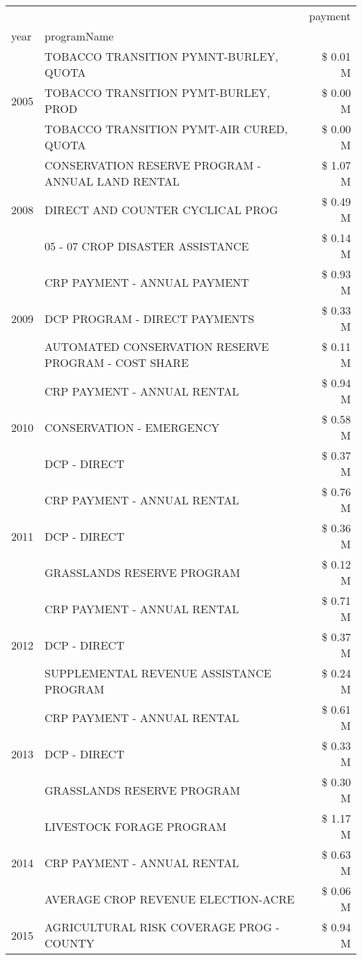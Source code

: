 \begin{tabular}{llr}
\toprule
 &  & payment \\
year & programName &  \\
\midrule
\multirow[t]{3}{*}{2005} & TOBACCO TRANSITION PYMNT-BURLEY, QUOTA & \$ 0.01 M \\
 & TOBACCO TRANSITION PYMT-BURLEY, PROD & \$ 0.00 M \\
 & TOBACCO TRANSITION PYMT-AIR CURED, QUOTA & \$ 0.00 M \\
\cline{1-3}
\multirow[t]{3}{*}{2008} & CONSERVATION RESERVE PROGRAM - ANNUAL LAND RENTAL & \$ 1.07 M \\
 & DIRECT AND COUNTER CYCLICAL PROG & \$ 0.49 M \\
 & 05 - 07 CROP DISASTER ASSISTANCE & \$ 0.14 M \\
\cline{1-3}
\multirow[t]{3}{*}{2009} & CRP PAYMENT - ANNUAL PAYMENT & \$ 0.93 M \\
 & DCP PROGRAM - DIRECT PAYMENTS & \$ 0.33 M \\
 & AUTOMATED CONSERVATION RESERVE PROGRAM - COST SHARE & \$ 0.11 M \\
\cline{1-3}
\multirow[t]{3}{*}{2010} & CRP PAYMENT - ANNUAL RENTAL & \$ 0.94 M \\
 & CONSERVATION - EMERGENCY & \$ 0.58 M \\
 & DCP - DIRECT & \$ 0.37 M \\
\cline{1-3}
\multirow[t]{3}{*}{2011} & CRP PAYMENT - ANNUAL RENTAL & \$ 0.76 M \\
 & DCP - DIRECT & \$ 0.36 M \\
 & GRASSLANDS RESERVE PROGRAM & \$ 0.12 M \\
\cline{1-3}
\multirow[t]{3}{*}{2012} & CRP PAYMENT - ANNUAL RENTAL & \$ 0.71 M \\
 & DCP - DIRECT & \$ 0.37 M \\
 & SUPPLEMENTAL REVENUE ASSISTANCE PROGRAM & \$ 0.24 M \\
\cline{1-3}
\multirow[t]{3}{*}{2013} & CRP PAYMENT - ANNUAL RENTAL & \$ 0.61 M \\
 & DCP - DIRECT & \$ 0.33 M \\
 & GRASSLANDS RESERVE PROGRAM & \$ 0.30 M \\
\cline{1-3}
\multirow[t]{3}{*}{2014} & LIVESTOCK FORAGE PROGRAM & \$ 1.17 M \\
 & CRP PAYMENT - ANNUAL RENTAL & \$ 0.63 M \\
 & AVERAGE CROP REVENUE ELECTION-ACRE & \$ 0.06 M \\
\cline{1-3}
\multirow[t]{3}{*}{2015} & AGRICULTURAL RISK COVERAGE PROG - COUNTY & \$ 0.94 M \\

\end{tabular}
